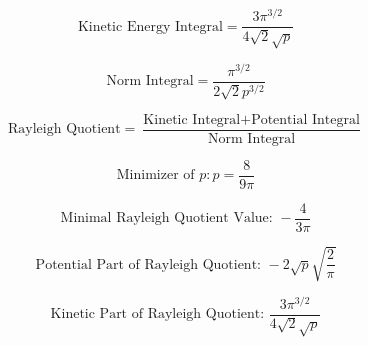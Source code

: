 \begin{equation}
	\text{Kinetic Energy Integral} = 
	\frac{3 \pi^{3/2}}{4 \sqrt{2} \sqrt{p}}
\end{equation}

\begin{equation}
	\text{Norm Integral} = \frac{\pi^{3/2}}{2 \sqrt{2} p^{3/2}}
\end{equation}

\begin{equation}
	\text{Rayleigh Quotient} = \frac{\text{Kinetic Integral} + \text{Potential Integral}}{\text{Norm Integral}}
\end{equation}

\begin{equation}
	\text{Minimizer of } p: p = \frac{8}{9\pi}
\end{equation}

\begin{equation}
	\text{Minimal Rayleigh Quotient Value: } -\frac{4}{3\pi}
\end{equation}

\begin{equation}
	\text{Potential Part of Rayleigh Quotient: } -2\sqrt{p} \sqrt{\frac{2}{\pi}}
\end{equation}

\begin{equation}
	\text{Kinetic Part of Rayleigh Quotient: } \frac{3 \pi^{3/2}}{4 \sqrt{2} \sqrt{p}}
\end{equation}
